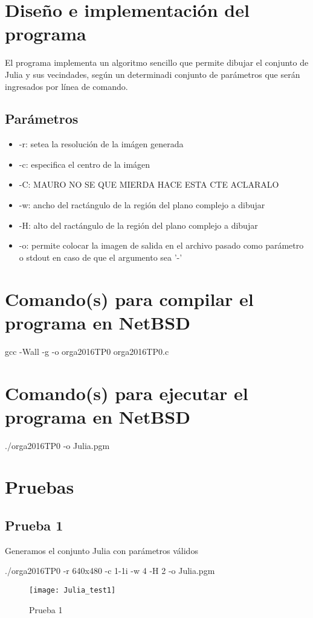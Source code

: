 \documentclass{article}
\begin{document}
\section{Diseño e implementaci\'on del programa}
\indent El programa implementa un algoritmo sencillo que permite dibujar el conjunto de Julia y sus vecindades, seg\'un un determinadi conjunto de par\'ametros que ser\'an ingresados por l\'inea de comando. 

\subsection{Par\'ametros}
\begin{itemize}
    \item -r: setea la resoluci\'on de la im\'agen generada
    \item -c: especifica el centro de la im\'agen
    \item -C: MAURO NO SE QUE MIERDA HACE ESTA CTE ACLARALO
    \item -w: ancho del ract\'angulo de la regi\'on del plano complejo a dibujar
    \item -H: alto del ract\'angulo de la regi\'on del plano complejo a dibujar
    \item -o: permite colocar la imagen de salida en el archivo pasado como par\'{a}metro o stdout en caso de que el argumento sea '-'
\end{itemize}
 
\section{Comando(s) para compilar el programa en NetBSD}
    gcc -Wall -g -o orga2016TP0 orga2016TP0.c    
\section{Comando(s) para ejecutar el programa en NetBSD}
    ./orga2016TP0 -o Julia.pgm
    
\section{Pruebas}
\subsection{Prueba 1}
Generamos el conjunto Julia con par\'ametros v\'alidos
\begin{center}
    ./orga2016TP0 -r 640x480 -c 1-1i -w 4 -H 2 -o Julia.pgm
\end{center}
\begin{figure}[H]
  \begin{center}
  	\texttt{[image: Julia\_test1]}
  \end{center}
  \caption{Prueba 1}
\end{figure}
\end{document}
